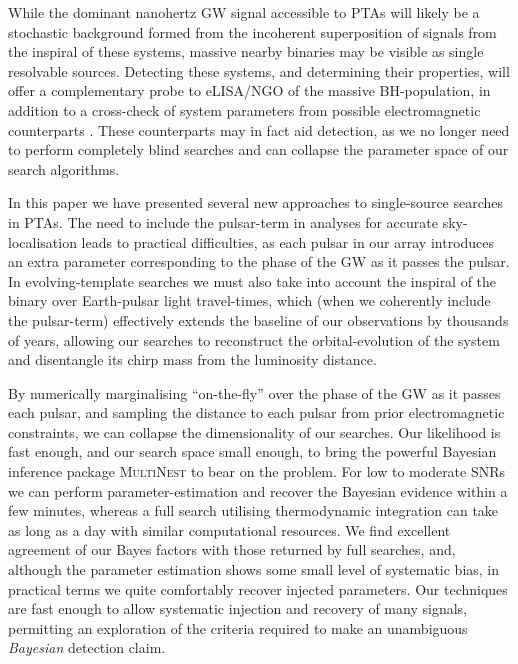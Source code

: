 \documentclass[twocolappendix,tighten]{emulateapj}
\begin{document}
While the dominant nanohertz GW signal accessible to PTAs will likely be a stochastic background formed from the incoherent superposition of signals from the inspiral of these systems, massive nearby binaries may be visible as single resolvable sources. Detecting these systems, and determining their properties, will offer a complementary probe to eLISA/NGO of the massive BH-population, in addition to a cross-check of system parameters from possible electromagnetic counterparts \citep[see][and references therein]{burkespolaor2013}. These counterparts may in fact aid detection, as we no longer need to perform completely blind searches and can collapse the parameter space of our search algorithms.

In this paper we have presented several new approaches to single-source searches in PTAs. The need to include the pulsar-term in analyses for accurate sky-localisation leads to practical difficulties, as each pulsar in our array introduces an extra parameter corresponding to the phase of the GW as it passes the pulsar. In evolving-template searches we must also take into account the inspiral of the binary over Earth-pulsar light travel-times, which (when we coherently include the pulsar-term) effectively extends the baseline of our observations by thousands of years, allowing our searches to reconstruct the orbital-evolution of the system and disentangle its chirp mass from the luminosity distance.

By numerically marginalising ``on-the-fly'' over the phase of the GW as it passes each pulsar, and sampling the distance to each pulsar from prior electromagnetic constraints, we can collapse the dimensionality of our searches. Our likelihood is fast enough, and our search space small enough, to bring the powerful Bayesian inference package \textsc{MultiNest} to bear on the problem. For low to moderate SNRs we can perform parameter-estimation and recover the Bayesian evidence within a few minutes, whereas a full search utilising thermodynamic integration can take as long as a day with similar computational resources. We find excellent agreement of our Bayes factors with those returned by full searches, and, although the parameter estimation shows some small level of systematic bias, in practical terms we quite comfortably recover injected parameters. Our techniques are fast enough to allow systematic injection and recovery of many signals, permitting an exploration of the criteria required to make an unambiguous {\it Bayesian} detection claim.

\appendix
\end{document}

